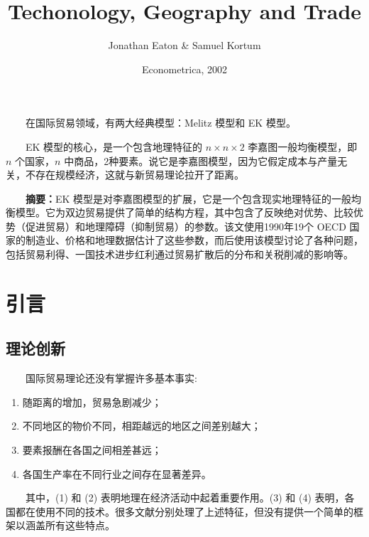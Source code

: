 \documentclass[]{tufte-handout}
\title{Techonology, Geography and Trade}
\author{Jonathan Eaton \& Samuel Kortum}
\date{Econometrica, 2002}
\providecommand{\tightlist}{%
  \setlength{\itemsep}{0pt}\setlength{\parskip}{0pt}}
\begin{document}
\maketitle




\begin{marginfigure}
　　在国际贸易领域，有两大经典模型：Melitz 模型和 EK 模型。

　　EK 模型的核心，是一个包含地理特征的 \(n \times n \times 2\)
李嘉图一般均衡模型，即 \(n\) 个国家，\(n\)
中商品，2种要素。说它是李嘉图模型，因为它假定成本与产量无关，不存在规模经济，这就与新贸易理论拉开了距离。
\end{marginfigure}

　　{\textbf{摘要：}}EK
模型是对李嘉图模型的扩展，它是一个包含现实地理特征的一般均衡模型。它为双边贸易提供了简单的结构方程，其中包含了反映绝对优势、比较优势（促进贸易）和地理障碍（抑制贸易）的参数。该文使用1990年19个
OECD
国家的制造业、价格和地理数据估计了这些参数，而后使用该模型讨论了各种问题，包括贸易利得、一国技术进步红利通过贸易扩散后的分布和关税削减的影响等。

\hypertarget{ux5f15ux8a00}{%
\section{引言}\label{ux5f15ux8a00}}

\hypertarget{ux7406ux8bbaux521bux65b0}{%
\subsection{理论创新}\label{ux7406ux8bbaux521bux65b0}}

　　国际贸易理论还没有掌握许多基本事实:

\begin{enumerate}
\def\labelenumi{(\arabic{enumi})}
\tightlist
\item
  随距离的增加，贸易急剧减少；\\
\item
  不同地区的物价不同，相距越远的地区之间差别越大；\\
\item
  要素报酬在各国之间相差甚远；\\
\item
  各国生产率在不同行业之间存在显著差异。
\end{enumerate}

　　其中，(1) 和 (2) 表明地理在经济活动中起着重要作用。(3) 和 (4)
表明，各国都在使用不同的技术。很多文献分别处理了上述特征，但没有提供一个简单的框架以涵盖所有这些特点。
\end{document}
